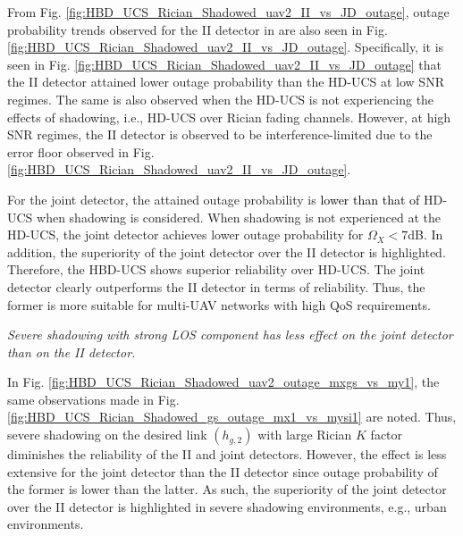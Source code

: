 From Fig. \ref{fig:HBD_UCS_Rician_Shadowed_uav2_II_vs_JD_outage}, outage probability trends observed for the II detector in \cite[Fig. 4]{tan2018ricianShad} are also seen in Fig. \ref{fig:HBD_UCS_Rician_Shadowed_uav2_II_vs_JD_outage}. Specifically, it is seen in Fig. \ref{fig:HBD_UCS_Rician_Shadowed_uav2_II_vs_JD_outage} that the II detector attained lower outage probability than the HD-UCS at low SNR regimes. The same is also observed when the HD-UCS is not experiencing the effects of shadowing, i.e., HD-UCS over Rician fading channels. However, at high SNR regimes, the II detector is observed to be interference-limited due to the error floor observed in Fig. \ref{fig:HBD_UCS_Rician_Shadowed_uav2_II_vs_JD_outage}.

For the joint detector, the attained outage probability is \textcolor{black}{lower than that of} HD-UCS when shadowing is considered. When shadowing is not experienced at the HD-UCS, the joint detector achieves lower outage probability for $\Omega_X < 7$dB. In addition, the superiority of the joint detector over the II detector is highlighted. Therefore, the HBD-UCS shows superior reliability over HD-UCS. The joint detector clearly outperforms the II detector in terms of reliability. Thus, the former is more suitable for multi-UAV networks with high QoS requirements.


\begin{observation}
\emph{\emph{Severe shadowing with strong LOS component has less effect on the joint detector than on the II detector.}
}\end{observation}

In Fig. \ref{fig:HBD_UCS_Rician_Shadowed_uav2_outage_mxgs_vs_my1}, the same observations made in Fig. \ref{fig:HBD_UCS_Rician_Shadowed_gs_outage_mx1_vs_mysi1} are noted. Thus, severe shadowing on the desired link $(h_{g,2})$ with large Rician $K$ factor diminishes the reliability of the II and joint detectors. However, the effect is less extensive for the joint detector than the II detector since outage probability of the former is lower than the latter. As such, the superiority of the joint detector over the II detector is highlighted in severe shadowing environments, e.g., urban environments. 

